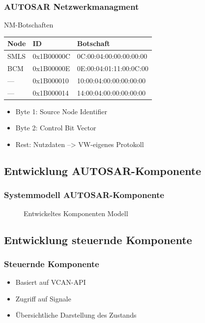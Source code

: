 \documentclass[]{beamer}
\newcommand{\inputImage}[1]{}
\begin{document}
\begin{frame}
\frametitle{AUTOSAR Netzwerkmanagment}
    \begin{exampleblock}{NM-Botschaften}
        \begin{table}
        \centering
            \begin{tabular}[h]{l l l}
                Node & ID & Botschaft\\
                \toprule
                SMLS        & 0x1B00000C & 0C:00:04:00:00:00:00:00\\
                BCM         & 0x1B00000E & 0E:00:04:01:11:00:0C:00\\
                ---         & 0x1B000010 & 10:00:04:00:00:00:00:00\\
                ---         & 0x1B000014 & 14:00:04:00:00:00:00:00\\
            \end{tabular}
        \label{tab:jitter_statistik}
        \end{table}
    \end{exampleblock}
    \begin{itemize}
        \item Byte 1: Source Node Identifier
        \item Byte 2: Control Bit Vector
        \item Rest: Nutzdaten --> VW-eigenes Protokoll
    \end{itemize}
\end{frame}




\subsection{Entwicklung AUTOSAR-Komponente}
\begin{frame}
\frametitle{Systemmodell AUTOSAR-Komponente}
    \begin{figure}[ht]
        \centering
        \resizebox{\linewidth}{!}{\inputImage{SMLS_Modell.dia}}
        \caption{Entwickeltes Komponenten Modell}
        \label{fig:smls_modell}
    \end{figure}
\end{frame}




\subsection{Entwicklung steuernde Komponente}
\begin{frame}
\frametitle{Steuernde Komponente}
    \begin{itemize}
        \item Basiert auf VCAN-API
        \item Zugriff auf Signale
        \item Übersichtliche Darstellung des Zustands
    \end{itemize}
\end{frame}
\end{document}
